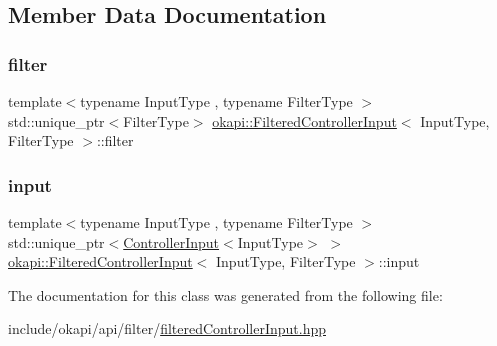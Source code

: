 \subsection{Member Data Documentation}
\mbox{\label{classokapi_1_1FilteredControllerInput_abe6797c377795f6bf995053bbb46c870}} 
\subsubsection{\texorpdfstring{filter}{filter}}
{\footnotesize\ttfamily template$<$typename Input\+Type , typename Filter\+Type $>$ \\
std\+::unique\+\_\+ptr$<$Filter\+Type$>$ \mbox{\hyperlink{classokapi_1_1FilteredControllerInput}{okapi\+::\+Filtered\+Controller\+Input}}$<$ Input\+Type, Filter\+Type $>$\+::filter\hspace{0.3cm}{\ttfamily [protected]}}

\mbox{\label{classokapi_1_1FilteredControllerInput_a402aed1f5ce334f1f2894026dfc80250}} 
\subsubsection{\texorpdfstring{input}{input}}
{\footnotesize\ttfamily template$<$typename Input\+Type , typename Filter\+Type $>$ \\
std\+::unique\+\_\+ptr$<$\mbox{\hyperlink{classokapi_1_1ControllerInput}{Controller\+Input}}$<$Input\+Type$>$ $>$ \mbox{\hyperlink{classokapi_1_1FilteredControllerInput}{okapi\+::\+Filtered\+Controller\+Input}}$<$ Input\+Type, Filter\+Type $>$\+::input\hspace{0.3cm}{\ttfamily [protected]}}



The documentation for this class was generated from the following file\+:\begin{DoxyCompactItemize}
\item 
include/okapi/api/filter/\mbox{\hyperlink{filteredControllerInput_8hpp}{filtered\+Controller\+Input.\+hpp}}\end{DoxyCompactItemize}
